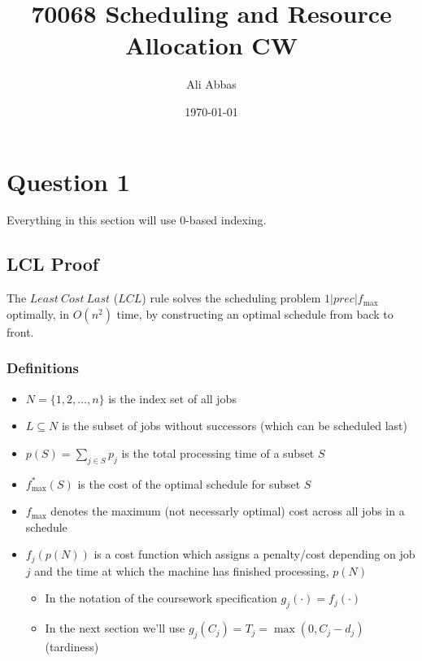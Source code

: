 \documentclass[fleqn]{article}
\date{\today}
\author{Ali Abbas}
\title{70068 Scheduling and Resource Allocation CW}
\begin{document}
  \maketitle
  \section{Question 1}
  Everything in this section will use 0-based indexing.
  \subsection{LCL Proof}
  The $Least\ Cost\ Last$ ($LCL$) rule solves the scheduling problem $1 | prec | f_{\text{max}}$ optimally, in $O(n^2)$ time, by constructing
  an optimal schedule from back to front.

  \subsubsection*{Definitions}
  \begin{itemize}
    \item $N = \{ 1, 2, \dots, n \}$ is the index set of all jobs
    \item $L \subseteq N$ is the subset of jobs without successors (which can be scheduled last)
    \item $p(S) = \sum_{j \in S} p_j$ is the total processing time of a subset $S$
    \item $f^*_{\text{max}}(S)$ is the cost of the optimal schedule for subset $S$
    \item $f_{\text{max}}$ denotes the maximum (not necessarly optimal) cost across all jobs in a schedule
    \item $f_j(p(N))$ is a cost function which assigns a penalty/cost depending on job $j$ and the time at which the machine has finished processing, $p(N)$
    \begin{itemize}
      \item In the notation of the coursework specification $g_j(\cdot) = f_j(\cdot)$
      \item In the next section we'll use $g_j(C_j) = T_j = \max(0, C_j - d_j)$ (tardiness)
    \end{itemize}
  \end{itemize}
\end{document}
